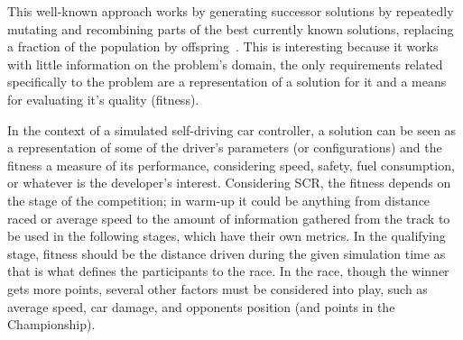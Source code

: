 This well-known approach works by generating successor solutions by repeatedly mutating and recombining parts of the best currently known solutions, replacing a fraction of the population by offspring~\cite{mitchell_1997}. This is interesting because it works with little information on the problem's domain, the only requirements related specifically to the problem are a representation of a solution for it and a means for evaluating it's quality (fitness).

In the context of a simulated self-driving car controller, a solution can be seen as a representation of some of the driver's parameters (or configurations) and the fitness a measure of its performance, considering speed, safety, fuel consumption, or whatever is the developer's interest. Considering SCR, the fitness depends on the stage of the competition; in warm-up it could be anything from distance raced or average speed to the amount of information gathered from the track to be used in the following stages, which have their own metrics. In the qualifying stage, fitness should be the distance driven during the given simulation time as that is what defines the participants to the race. In the race, though the winner gets more points, several other factors must be considered into play, such as average speed, car damage, and opponents position (and points in the Championship).
